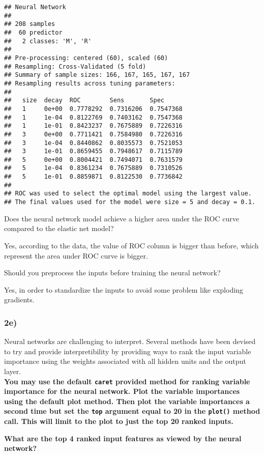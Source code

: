 \documentclass[
]{article}
\begin{document}
\begin{verbatim}
## Neural Network 
## 
## 208 samples
##  60 predictor
##   2 classes: 'M', 'R' 
## 
## Pre-processing: centered (60), scaled (60) 
## Resampling: Cross-Validated (5 fold) 
## Summary of sample sizes: 166, 167, 165, 167, 167 
## Resampling results across tuning parameters:
## 
##   size  decay  ROC        Sens       Spec     
##   1     0e+00  0.7778292  0.7316206  0.7547368
##   1     1e-04  0.8122769  0.7403162  0.7547368
##   1     1e-01  0.8423237  0.7675889  0.7226316
##   3     0e+00  0.7711421  0.7584980  0.7226316
##   3     1e-04  0.8440862  0.8035573  0.7521053
##   3     1e-01  0.8659455  0.7948617  0.7115789
##   5     0e+00  0.8004421  0.7494071  0.7631579
##   5     1e-04  0.8361234  0.7675889  0.7310526
##   5     1e-01  0.8859871  0.8122530  0.7736842
## 
## ROC was used to select the optimal model using the largest value.
## The final values used for the model were size = 5 and decay = 0.1.
\end{verbatim}

Does the neural network model achieve a higher area under the ROC curve
compared to the elastic net model?

Yes, according to the data, the value of ROC column is bigger than
before, which represent the area under ROC curve is bigger.

Should you preprocess the inputs before training the neural network?

Yes, in order to standardize the inputs to avoid some problem like
exploding gradients.

\hypertarget{e-1}{%
\subsubsection{2e)}\label{e-1}}

Neural networks are challenging to interpret. Several methods have been
devised to try and provide interpretibility by providing ways to rank
the input variable importance using the weights associated with all
hidden units and the output layer.\\
\textbf{You may use the default \texttt{caret} provided method for
ranking variable importance for the neural network. Plot the variable
importances using the default plot method. Then plot the variable
importances a second time but set the \texttt{top} argument equal to 20
in the \texttt{plot()} method call. This will limit to the plot to just
the top 20 ranked inputs.}

\textbf{What are the top 4 ranked input features as viewed by the neural
network?}
\end{document}
